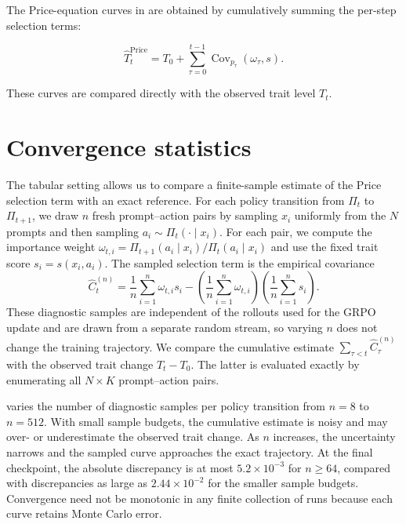 The Price-equation curves in  are obtained by cumulatively summing the per-step selection terms:

\begin{equation*}
    \widehat{T}_t^{\mathrm{Price}}
    =
    T_0
    +
    \sum_{\tau=0}^{t-1}
    \operatorname{Cov}_{p_\tau}
    \left(\omega_\tau,s\right).
\end{equation*}

These curves are compared directly with the observed trait level $T_t$.
\section{Convergence statistics}\label{app:convergence-statistics}

The tabular setting allows us to compare a finite-sample estimate of the Price selection term with an exact reference. For each policy transition from $\Pi_t$ to $\Pi_{t+1}$, we draw $n$ fresh prompt--action pairs by sampling $x_i$ uniformly from the $N$ prompts and then sampling $a_i\sim\Pi_t(\cdot\mid x_i)$. For each pair, we compute the importance weight $\omega_{t,i}=\Pi_{t+1}(a_i\mid x_i)/\Pi_t(a_i\mid x_i)$ and use the fixed trait score $s_i=s(x_i,a_i)$. The sampled selection term is the empirical covariance
\begin{equation*}
    \widehat C_t^{(n)}
    =
    \frac{1}{n}\sum_{i=1}^{n}\omega_{t,i}s_i
    -
    \left(\frac{1}{n}\sum_{i=1}^{n}\omega_{t,i}\right)
    \left(\frac{1}{n}\sum_{i=1}^{n}s_i\right).
\end{equation*}
These diagnostic samples are independent of the rollouts used for the GRPO update and are drawn from a separate random stream, so varying $n$ does not change the training trajectory. We compare the cumulative estimate $\sum_{\tau<t}\widehat C_\tau^{(n)}$ with the observed trait change $T_t-T_0$. The latter is evaluated exactly by enumerating all $N\times K$ prompt--action pairs.

 varies the number of diagnostic samples per policy transition from $n=8$ to $n=512$. With small sample budgets, the cumulative estimate is noisy and may over- or underestimate the observed trait change. As $n$ increases, the uncertainty narrows and the sampled curve approaches the exact trajectory. At the final checkpoint, the absolute discrepancy is at most $5.2\times10^{-3}$ for $n\geq64$, compared with discrepancies as large as $2.44\times10^{-2}$ for the smaller sample budgets. Convergence need not be monotonic in any finite collection of runs because each curve retains Monte Carlo error.


